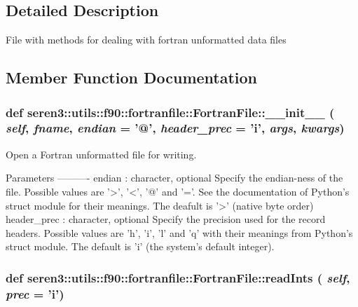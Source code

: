 \subsection{Detailed Description}
\begin{DoxyVerb}File with methods for dealing with fortran unformatted data files\end{DoxyVerb}
 

\subsection{Member Function Documentation}
\hypertarget{classseren3_1_1utils_1_1f90_1_1fortranfile_1_1FortranFile_adbddc016568070013cb3a1a289ced73f}{
\subsubsection[{\_\-\_\-init\_\-\_\-}]{\setlength{\rightskip}{0pt plus 5cm}def seren3::utils::f90::fortranfile::FortranFile::\_\-\_\-init\_\-\_\- ( {\em self}, \/   {\em fname}, \/   {\em endian} = {\ttfamily '@'}, \/   {\em header\_\-prec} = {\ttfamily 'i'}, \/   {\em args}, \/   {\em kwargs})}}
\label{classseren3_1_1utils_1_1f90_1_1fortranfile_1_1FortranFile_adbddc016568070013cb3a1a289ced73f}
\begin{DoxyVerb}Open a Fortran unformatted file for writing.

Parameters
----------
endian : character, optional
    Specify the endian-ness of the file.  Possible values are
    '>', '<', '@' and '='.  See the documentation of Python's
    struct module for their meanings.  The deafult is '>' (native
    byte order)
header_prec : character, optional
    Specify the precision used for the record headers.  Possible
    values are 'h', 'i', 'l' and 'q' with their meanings from
    Python's struct module.  The default is 'i' (the system's
    default integer).

\end{DoxyVerb}
 \hypertarget{classseren3_1_1utils_1_1f90_1_1fortranfile_1_1FortranFile_a3280686a5ad1ca9bda485433d63a547a}{
\subsubsection[{readInts}]{\setlength{\rightskip}{0pt plus 5cm}def seren3::utils::f90::fortranfile::FortranFile::readInts ( {\em self}, \/   {\em prec} = {\ttfamily 'i'})}}
